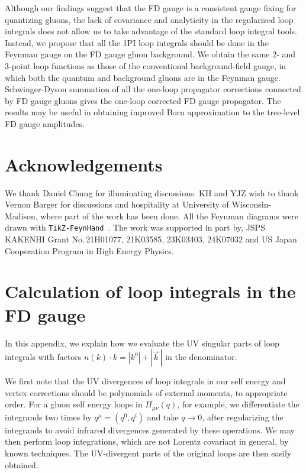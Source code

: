 \documentclass[preprint,amsmath,amssymb,superscriptaddress, floatfix,nofootinbib]{revtex4}
\begin{document}
Although our findings suggest that the FD gauge is a consistent
gauge fixing for quantizing gluons, the lack of covariance and analyticity in
the regularized loop integrals does not allow us to take advantage
of the standard loop integral tools.
%
Instead, we propose that all the 1PI loop integrals should be
done in the Feynman gauge on the FD gauge gluon background. 
%
We obtain the same 2- and 3-point loop functions as those of
the conventional background-field gauge, 
in which both the quantum and background 
gluons are in the Feynman gauge.
%
Schwinger-Dyson summation of all the one-loop propagator
corrections connected by FD gauge gluons gives the one-loop
corrected FD gauge propagator. 
%
The results may be useful in obtaining improved Born 
approximation to the tree-level FD gauge amplitudes.
\section*{Acknowledgements}
  We thank Daniel Chung for illuminating discussions.
  KH and YJZ wish to thank Vernon Barger for discussions
  and hospitality at University of Wisconsin-Madison,
  where part of the work has been done.
All the Feynman diagrams were drawn with 
{\tt TikZ-FeynHand}~\cite{Ellis:2016jkw,Dohse:2018vqo}.
The work was supported in part by, JSPS KAKENHI Grant No.\,21H01077, 21K03585, 23K03403, 
24K07032 and US Japan Cooperation Program in High Energy Physics.


\appendix
\renewcommand{\thesection}{\Alph{section}}
\section{Calculation of loop integrals in the FD gauge}
\label{sec:AppA}

In this appendix, we explain how we 
evaluate the UV singular parts of loop integrals 
with factors $n(k)\cdot k=|k^0|+|\vec{k}\,|$ in the denominator. 

We first note that the UV divergences of loop integrals in our self energy and 
vertex corrections should be polynomials of external momenta, to appropriate order. 
For a gluon self energy loops in $\Pi_{\mu\nu}(q)$, for example, we 
differentiate the integrands two times 
by $q^{\mu}=(q^0,q^i)$ and 
take $q\to 0$, after regularizing the integrands to avoid 
infrared divergences generated by these operations. 
We may then perform loop integrations, which are not Lorentz covariant in general, 
by known techniques. 
The UV-divergent parts of the original loops are then easily obtained. 
\end{document}
